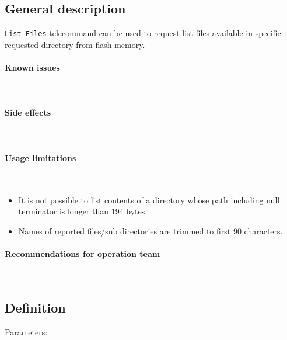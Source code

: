 

\subsection{General description}
\texttt{List Files} telecommand can be used to request list files available in specific requested directory 
from flash memory. 

\paragraph{Known issues} \mbox{} \\
\None

\paragraph{Side effects} \mbox{} \\
\None

\paragraph{Usage limitations} \mbox{} \\
\begin{itemize}
    \item It is not possible to list contents of a directory whose path including null terminator is longer than 194 bytes.
    \item Names of reported files/sub directories are trimmed to first 90 characters.
\end{itemize}

\paragraph{Recommendations for operation team} \mbox{} \\
\None

\subsection{Definition}

Parameters: 

\begin{tcarglist}
\end{tcarglist}

